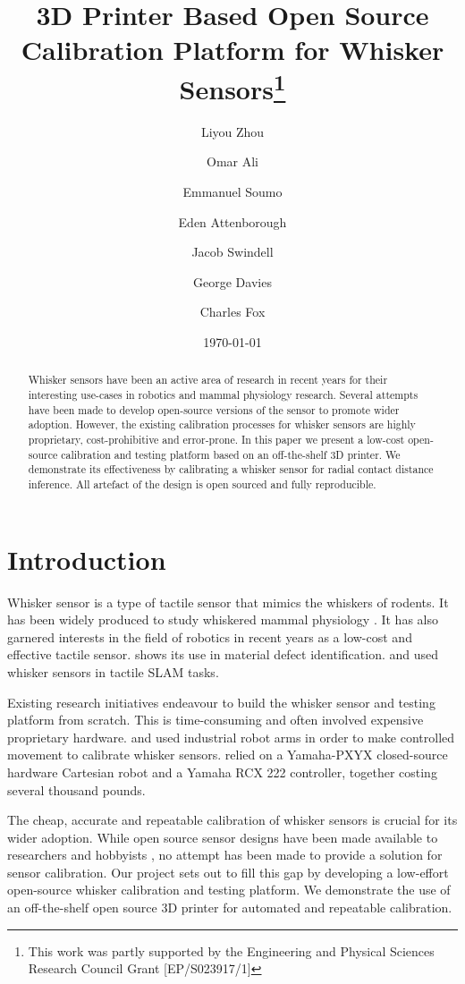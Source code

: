 \documentclass[runningheads]{llncs}
\title{3D Printer Based Open Source Calibration Platform for Whisker Sensors\thanks{This work was partly supported by the Engineering and Physical Sciences
Research Council Grant [EP/S023917/1]}}
\author{
    Liyou Zhou\orcidID{0009-0005-9491-9003} \and
    Omar Ali \and
    Emmanuel Soumo \and
    Eden Attenborough \and
    Jacob Swindell \and
    George Davies \and
    Charles Fox
}
\institute{School of Computer Science, University of Lincoln, Lincoln, UK}
\date{\today}
\begin{document}
\maketitle

\begin{abstract}
Whisker sensors have been an active area of research in recent years for their interesting use-cases in robotics and mammal physiology research. Several attempts have been made to develop open-source versions of the sensor to promote wider adoption. However, the existing calibration processes for whisker sensors are highly proprietary, cost-prohibitive and error-prone. In this paper we present a low-cost open-source calibration and testing platform based on an off-the-shelf 3D printer. We demonstrate its effectiveness by calibrating a whisker sensor for radial contact distance inference. All artefact of the design is open sourced and fully reproducible.
\end{abstract}

\section{Introduction}

Whisker sensor is a type of tactile sensor that mimics the whiskers of rodents. It has been widely produced to study whiskered mammal physiology \cite{prescottActiveTouchSensing2020}. It has also garnered interests in the field of robotics in recent years as a low-cost and effective tactile sensor. \cite{fotouhiDetectionBarelyVisible2021} shows its use in material defect identification. \cite{struckmeierViTaSLAMBioinspiredVisuoTactile2019} and \cite{foxTactileSLAMBiomimetic2012} used whisker sensors in tactile SLAM tasks.

Existing research initiatives endeavour to build the whisker sensor and testing platform from scratch. This is time-consuming and often involved expensive proprietary hardware. \cite{sullivanTactileDiscriminationUsing2012a} and \cite{fotouhiDetectionBarelyVisible2021} used industrial robot arms in order to make controlled movement to calibrate whisker sensors. \cite{evansWhiskerobjectContactSpeed2010a} relied on a Yamaha-PXYX closed-source hardware Cartesian robot and a Yamaha RCX 222 controller, together costing several thousand pounds.

The cheap, accurate and repeatable calibration of whisker sensors is crucial for its wider adoption. While open source sensor designs have been made available to researchers and hobbyists \cite{Paparas_Ratatouille-Whiskers_Ratatouille-Whisker_Ratatouille_Whisker_2024}, no attempt has been made to provide a solution for sensor calibration. Our project sets out to fill this gap by developing a low-effort open-source whisker calibration and testing platform. We demonstrate the use of an off-the-shelf open source 3D printer for automated and repeatable calibration.
\end{document}
